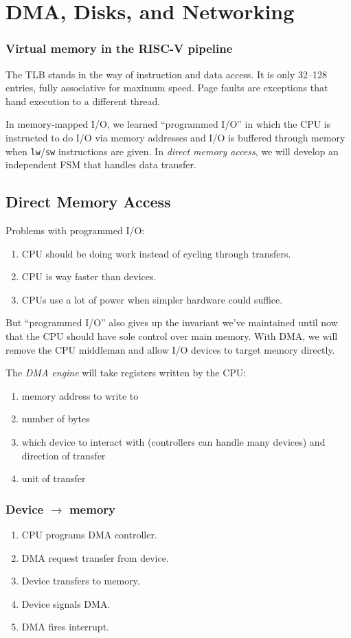\chapter{DMA, Disks, and Networking}
\subsection{Virtual memory in the RISC-V pipeline}
The TLB stands in the way of instruction and data access.
It is only 32--128 entries, fully associative for maximum speed.
Page faults are exceptions that hand execution to a different thread.

In memory-mapped I/O, we learned ``programmed I/O'' in which the CPU is instructed to do I/O via memory addresses and I/O is buffered through memory when \texttt{lw}/\texttt{sw} instructions are given.
In \emph{direct memory access}, we will develop an independent FSM
that handles data transfer.

\section{Direct Memory Access}
Problems with programmed I/O:
\begin{enumerate}
	\item CPU should be doing work instead of cycling through transfers.
	\item CPU is way faster than devices.
	\item CPUs use a lot of power when simpler hardware could suffice.
\end{enumerate}
But ``programmed I/O'' also gives up the invariant we've maintained until now that the CPU should have sole control over main memory.
With DMA, we will remove the CPU middleman and allow I/O devices to target memory directly.

The \emph{DMA engine} will take registers written by the CPU:
\begin{enumerate}
	\item memory address to write to
	\item number of bytes
	\item which device to interact with (controllers can handle many devices) and direction of transfer
	\item unit of transfer
\end{enumerate}

\subsection{Device \(\to\) memory}
\begin{enumerate}
	\item CPU programs DMA controller.
	\item DMA request transfer from device.
	\item Device transfers to memory.
	\item Device signals DMA.
	\item DMA fires interrupt.
\end{enumerate}

